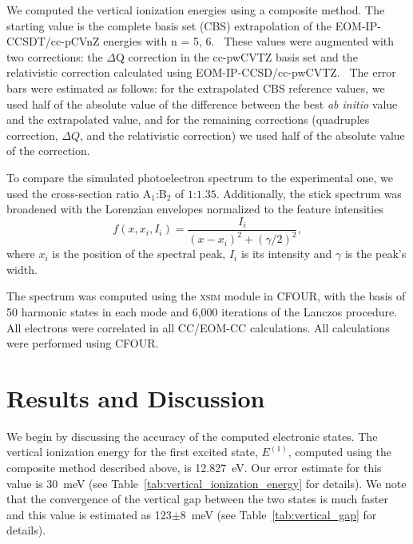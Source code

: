 \documentclass[12pt,prb,aps]{revtex4}
\begin{document}
We computed the vertical ionization energies using a composite method.  The
starting value is the complete basis set (CBS) extrapolation of the
EOM-IP-CCSDT/cc-pCVnZ energies with n = 5, 6.~\cite{Woon:95:CCBS} These values
were augmented with two corrections: the $\Delta$Q correction in the cc-pwCVTZ
basis set and the relativistic correction calculated using
EOM-IP-CCSD/cc-pwCVTZ.~\cite{Dunning:02:p(w)CVnZ} 
The error bars were estimated as follows: 
for the extrapolated CBS reference values, we used half of the absolute value
of the difference between the best \emph{ab initio} value and the extrapolated
value, and for the remaining corrections (quadruples correction, $\Delta Q$, and
the relativistic correction) we used half of the
absolute value of the correction.

To compare the simulated photoelectron spectrum to the experimental one, 
we used the
cross-section ratio A$_1$:B$_2$ of $1$:$1.35$.\cite{KDC:O3:92}
Additionally, the stick spectrum was broadened with the Lorenzian envelopes
normalized to the feature intensities
\begin{equation}
    f(x, x _i, I _i) = 
    \frac{I_i}{(x-x _i)^2 + (\gamma/ 2) ^2},
    \label{eq:lorentzian}
\end{equation}
where $x_i$ is the position of the spectral peak, $I_i$ is its intensity and
$\gamma$ is the peak's width.


The spectrum was computed using the \textsc{xsim} module in \textsc{CFOUR},
with the basis of 50 harmonic states in each mode and 6,000 iterations of the
Lanczos procedure.~\cite{Sharma:xsim_socjt:2024} All electrons were correlated in all CC/EOM-CC calculations. All calculations were performed 
using \textsc{CFOUR}.~\cite{cfour, cfour:2020}

\section{Results and Discussion}

We begin by discussing the accuracy of the computed electronic states.
The vertical ionization energy for the first excited state, $E^{(1)}$, 
computed using the composite
method described above, is  12.827~eV. Our error estimate for this value is
30~meV (see Table~\ref{tab:vertical_ionization_energy} for details).  We note
that the convergence of the vertical gap between the two states is much faster
and this value is estimated as 123$\pm8$~meV (see Table~\ref{tab:vertical_gap}
for details). 
\end{document}
